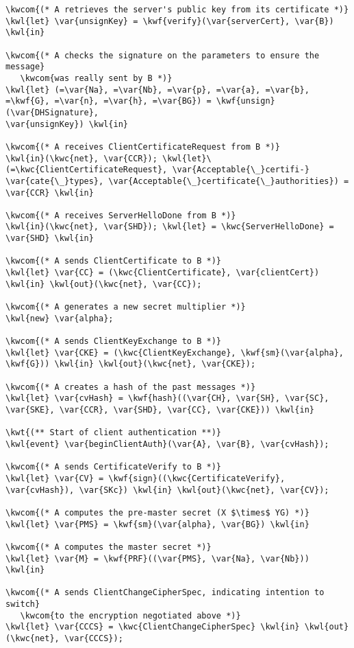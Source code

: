 \begin{Verbatim}[commandchars=\\\{\}, codes={\catcode`$=3}]
\kwcom{(* A retrieves the server's public key from its certificate *)}
\kwl{let} \var{unsignKey} = \kwf{verify}(\var{serverCert}, \var{B}) \kwl{in}

\kwcom{(* A checks the signature on the parameters to ensure the message}
   \kwcom{was really sent by B *)}
\kwl{let} (=\var{Na}, =\var{Nb}, =\var{p}, =\var{a}, =\var{b}, =\kwf{G}, =\var{n}, =\var{h}, =\var{BG}) = \kwf{unsign}(\var{DHSignature},
\var{unsignKey}) \kwl{in}

\kwcom{(* A receives ClientCertificateRequest from B *)}
\kwl{in}(\kwc{net}, \var{CCR}); \kwl{let}\ (=\kwc{ClientCertificateRequest}, \var{Acceptable{\_}certifi-}
\var{cate{\_}types}, \var{Acceptable{\_}certificate{\_}authorities}) = \var{CCR} \kwl{in}

\kwcom{(* A receives ServerHelloDone from B *)}
\kwl{in}(\kwc{net}, \var{SHD}); \kwl{let} = \kwc{ServerHelloDone} = \var{SHD} \kwl{in}

\kwcom{(* A sends ClientCertificate to B *)}
\kwl{let} \var{CC} = (\kwc{ClientCertificate}, \var{clientCert}) \kwl{in} \kwl{out}(\kwc{net}, \var{CC});

\kwcom{(* A generates a new secret multiplier *)}
\kwl{new} \var{alpha};

\kwcom{(* A sends ClientKeyExchange to B *)}
\kwl{let} \var{CKE} = (\kwc{ClientKeyExchange}, \kwf{sm}(\var{alpha}, \kwf{G})) \kwl{in} \kwl{out}(\kwc{net}, \var{CKE});

\kwcom{(* A creates a hash of the past messages *)}
\kwl{let} \var{cvHash} = \kwf{hash}((\var{CH}, \var{SH}, \var{SC}, \var{SKE}, \var{CCR}, \var{SHD}, \var{CC}, \var{CKE})) \kwl{in}

\kwt{(** Start of client authentication **)}
\kwl{event} \var{beginClientAuth}(\var{A}, \var{B}, \var{cvHash});

\kwcom{(* A sends CertificateVerify to B *)}
\kwl{let} \var{CV} = \kwf{sign}((\kwc{CertificateVerify}, \var{cvHash}), \var{SKc}) \kwl{in} \kwl{out}(\kwc{net}, \var{CV});

\kwcom{(* A computes the pre-master secret (X $\times$ YG) *)}
\kwl{let} \var{PMS} = \kwf{sm}(\var{alpha}, \var{BG}) \kwl{in}

\kwcom{(* A computes the master secret *)}
\kwl{let} \var{M} = \kwf{PRF}((\var{PMS}, \var{Na}, \var{Nb})) \kwl{in}

\kwcom{(* A sends ClientChangeCipherSpec, indicating intention to switch}
   \kwcom{to the encryption negotiated above *)}
\kwl{let} \var{CCCS} = \kwc{ClientChangeCipherSpec} \kwl{in} \kwl{out}(\kwc{net}, \var{CCCS});


\end{Verbatim}
